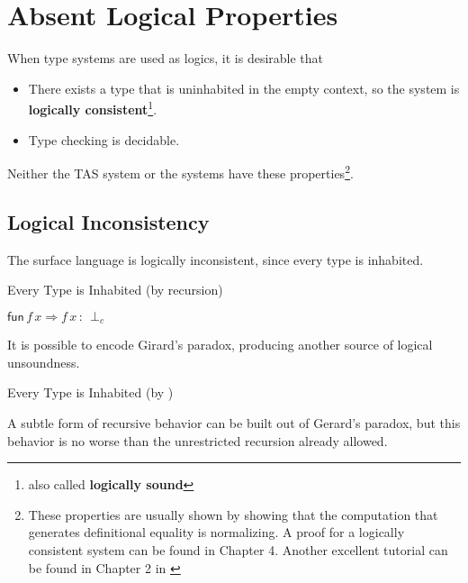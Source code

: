 \section{Absent Logical Properties}

When type systems are used as logics, it is desirable that
\begin{itemize}
\item There exists a type that is uninhabited in the empty context, so the system is \textbf{logically consistent}\footnote{also called \textbf{logically sound}}.
\item Type checking is decidable.
\end{itemize}
Neither the \ac{TAS} system or the \Bidir{} systems have these properties\footnote{
  These properties are usually shown by showing that the computation that generates definitional equality is normalizing.
  A proof for a logically consistent system can be found in Chapter 4\cite{luo1994computation}.
  Another excellent tutorial can be found in Chapter 2 in \cite{casinghino2014combiningthesis}}.

\subsection{Logical Inconsistency}

The surface language is logically inconsistent, since every type is inhabited.

\begin{example}
Every Type is Inhabited (by recursion)

$\mathsf{fun}\,f\,x\Rightarrow f\,x\,:\,\perp_{c}$
\end{example}

It is possible to encode Girard's paradox, producing another source of logical unsoundness.
\begin{example}
Every Type is Inhabited (by \tit{})


\end{example}

A subtle form of recursive behavior can be built out of Gerard's paradox\cite{Reinhold89typecheckingis}, but this behavior is no worse than the unrestricted recursion already allowed.

